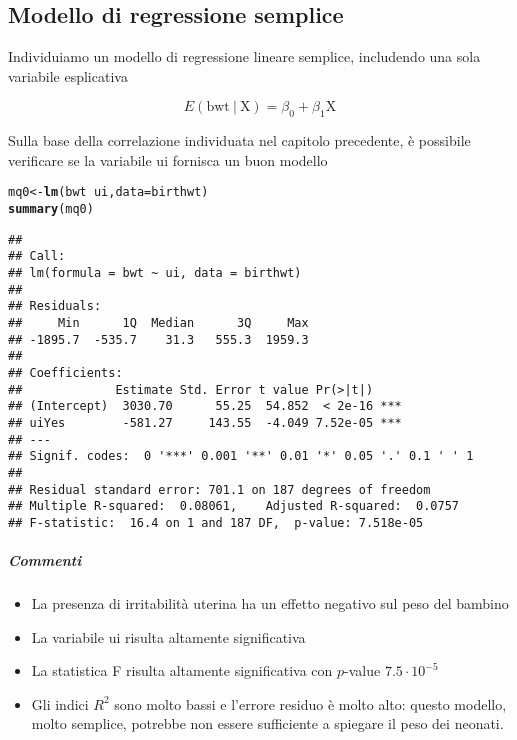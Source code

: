 \documentclass{article}\usepackage[]{graphicx}\usepackage[]{color}
\makeatletter
\newcommand{\hlopt}[1]{\textcolor[rgb]{0,0,0}{#1}}%
\newcommand{\hlstd}[1]{\textcolor[rgb]{0.345,0.345,0.345}{#1}}%
\newcommand{\hlkwb}[1]{\textcolor[rgb]{0.69,0.353,0.396}{#1}}%
\newcommand{\hlkwc}[1]{\textcolor[rgb]{0.333,0.667,0.333}{#1}}%
\newcommand{\hlkwd}[1]{\textcolor[rgb]{0.737,0.353,0.396}{\textbf{#1}}}%
\newenvironment{kframe}{%
 \def\at@end@of@kframe{}%
 \ifinner\ifhmode%
  \def\at@end@of@kframe{\end{minipage}}%
  \begin{minipage}{\columnwidth}%
 \fi\fi%
 \def\FrameCommand##1{\hskip\@totalleftmargin \hskip-\fboxsep
 \colorbox{shadecolor}{##1}\hskip-\fboxsep
     \hskip-\linewidth \hskip-\@totalleftmargin \hskip\columnwidth}%
 \MakeFramed {\advance\hsize-\width
   \@totalleftmargin\z@ \linewidth\hsize
   \@setminipage}}%
 {\par\unskip\endMakeFramed%
 \at@end@of@kframe}
\newenvironment{knitrout}{}{} %
\newcommand\given[1][]{\:#1\vert\:}
\makeatother
\begin{document}
\subsection{Modello di regressione semplice}
Individuiamo un modello di regressione lineare semplice, includendo una sola variabile esplicativa

$$E(\text{bwt} \given \text{X})= \beta_0 + \beta_1 \text{X}$$

Sulla base della correlazione individuata nel capitolo precedente, è possibile verificare se la variabile ui fornisca un buon modello 

\begin{knitrout}
\color{fgcolor}\begin{kframe}
\begin{alltt}
\hlstd{mq0} \hlkwb{<-} \hlkwd{lm}\hlstd{(bwt} \hlopt{~} \hlstd{ui,}\hlkwc{data}\hlstd{=birthwt)}
\hlkwd{summary}\hlstd{(mq0)}
\end{alltt}
\begin{verbatim}
## 
## Call:
## lm(formula = bwt ~ ui, data = birthwt)
## 
## Residuals:
##     Min      1Q  Median      3Q     Max 
## -1895.7  -535.7    31.3   555.3  1959.3 
## 
## Coefficients:
##             Estimate Std. Error t value Pr(>|t|)    
## (Intercept)  3030.70      55.25  54.852  < 2e-16 ***
## uiYes        -581.27     143.55  -4.049 7.52e-05 ***
## ---
## Signif. codes:  0 '***' 0.001 '**' 0.01 '*' 0.05 '.' 0.1 ' ' 1
## 
## Residual standard error: 701.1 on 187 degrees of freedom
## Multiple R-squared:  0.08061,	Adjusted R-squared:  0.0757 
## F-statistic:  16.4 on 1 and 187 DF,  p-value: 7.518e-05
\end{verbatim}
\end{kframe}
\end{knitrout}

\subparagraph{Commenti}
\begin{itemize}
\item La presenza di irritabilità uterina ha un effetto negativo sul peso del bambino
\item La variabile ui risulta altamente significativa
\item La statistica F risulta altamente significativa con $p$-value $7.5 \cdot 10^{-5}$
\item Gli indici $R^2$ sono molto bassi e l'errore residuo è molto alto: questo modello, molto semplice, potrebbe non essere sufficiente a spiegare il peso dei neonati.
\end{itemize}
\end{document}

